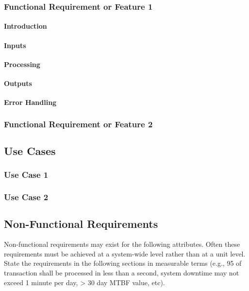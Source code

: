 \documentclass[titlepage]{article}
\begin{document}
\subsubsection{Functional Requirement or Feature 1}

\paragraph{Introduction}

\paragraph{Inputs}

\paragraph{Processing}

\paragraph{Outputs}

\paragraph{Error Handling}

\subsubsection{Functional Requirement or Feature 2}

\subsection{Use Cases}

\subsubsection{Use Case 1}

\subsubsection{Use Case 2}

\subsection{Non-Functional Requirements}
Non-functional requirements may exist for the following attributes.  Often these requirements must be achieved at a system-wide level rather than at a unit level.  State the requirements in the following sections in measurable terms (e.g., 95 of transaction shall be processed in less than a second, system downtime may not exceed 1 minute per day, > 30 day MTBF value, etc). 
\end{document}
